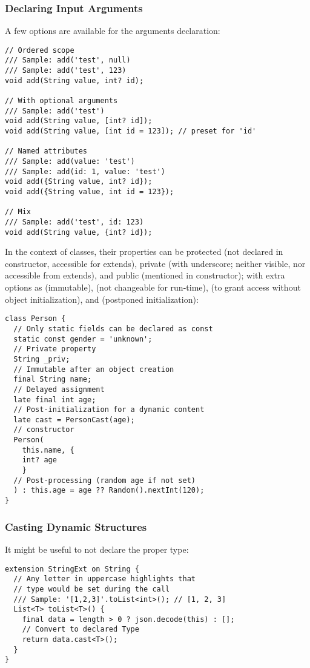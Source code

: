 \subsubsection{Declaring Input Arguments}

A few options are available for the arguments declaration:

\begin{lstlisting}
// Ordered scope
/// Sample: add('test', null) 
/// Sample: add('test', 123) 
void add(String value, int? id);

// With optional arguments
/// Sample: add('test')
void add(String value, [int? id]);
void add(String value, [int id = 123]); // preset for 'id'

// Named attributes
/// Sample: add(value: 'test')
/// Sample: add(id: 1, value: 'test')
void add({String value, int? id});
void add({String value, int id = 123});

// Mix
/// Sample: add('test', id: 123)
void add(String value, {int? id});
\end{lstlisting}

\noindent In the context of classes, their properties can be protected (not declared in constructor, accessible for 
extends), private (with underscore; neither visible, nor accessible from extends), and public (mentioned in 
constructor); with extra options as  (immutable),  (not changeable for run-time),  (to 
grant access without object initialization), and  (postponed initialization):

\begin{lstlisting}
class Person {
  // Only static fields can be declared as const
  static const gender = 'unknown';
  // Private property
  String _priv;
  // Immutable after an object creation
  final String name;
  // Delayed assignment
  late final int age;
  // Post-initialization for a dynamic content
  late cast = PersonCast(age);
  // constructor
  Person(
    this.name, {
    int? age
    }
  // Post-processing (random age if not set)
  ) : this.age = age ?? Random().nextInt(120);
}
\end{lstlisting}


\subsubsection{Casting Dynamic Structures}

It might be useful to not declare the proper type:

\begin{lstlisting}
extension StringExt on String {
  // Any letter in uppercase highlights that
  // type would be set during the call
  /// Sample: '[1,2,3]'.toList<int>(); // [1, 2, 3] 
  List<T> toList<T>() {
    final data = length > 0 ? json.decode(this) : [];
    // Convert to declared Type
    return data.cast<T>();
  }
}
\end{lstlisting}

